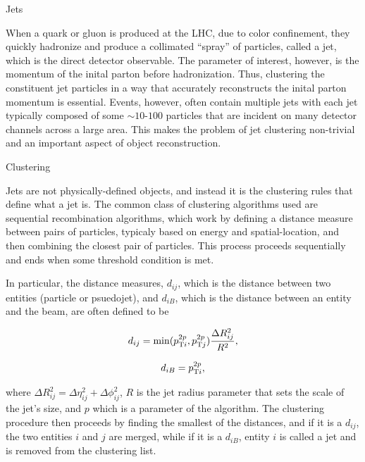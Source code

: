 \begin{section}{Jets}

When a quark or gluon is produced at the LHC, due to color confinement, they quickly hadronize and produce a collimated ``spray'' of particles, called a jet, which is the direct detector observable.
The parameter of interest, however, is the momentum of the inital parton before hadronization.
Thus, clustering the constituent jet particles in a way that accurately reconstructs the inital parton momentum is essential.
Events, however, often contain multiple jets with each jet typically composed of some $\sim10$-$100$ particles that are incident on many detector channels across a large area.
This makes the problem of jet clustering non-trivial and an important aspect of object reconstruction.

\begin{subsection}{Clustering}

Jets are not physically-defined objects, and instead it is the clustering rules that define what a jet is.
The common class of clustering algorithms used are sequential recombination algorithms, which work by defining a distance measure between pairs of particles, typicaly based on energy and spatial-location, and then combining the closest pair of particles.
This process proceeds sequentially and ends when some threshold condition is met.

In particular, the distance measures, $d_{ij}$, which is the distance between two entities (particle or psuedojet), and $d_{iB}$, which is the distance between an entity and the beam, are often defined to be

\begin{equation}
d_{ij} = \mathrm{min}(p_{\mathrm{T}i}^{2p},p_{\mathrm{T}j}^{2p})\frac{\Delta R_{ij}^{2}}{R^2},
\label{clustering_dij}
\end{equation}

\begin{equation}
d_{iB} = p_{\mathrm{T}i}^{2p},
\label{clustering_diB}
\end{equation}

where $\Delta R_{ij}^{2} = \Delta \eta_{ij}^{2} + \Delta \phi_{ij}^2$, $R$ is the jet radius parameter that sets the scale of the jet's size, and $p$ which is a parameter of the algorithm.
The clustering procedure then proceeds by finding the smallest of the distances, and if it is a $d_{ij}$, the two entities $i$ and $j$ are merged, while if it is a $d_{iB}$, entity $i$ is called a jet and is removed from the clustering list.


\end{subsection}
\end{section}
